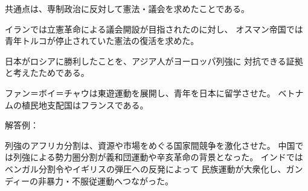 \documentclass[a4paper,11pt]{ltjsarticle}
\begin{document}
\begin{description}[
  style=nextline,
  leftmargin=0pt,
  labelindent=0pt
]
\item[第8問]

共通点は、専制政治に反対して憲法・議会を求めたことである。

イランでは立憲革命による議会開設が目指されたのに対し、
オスマン帝国では青年トルコが停止されていた憲法の復活を求めた。

\item[第9問]

日本がロシアに勝利したことを、アジア人がヨーロッパ列強に
対抗できる証拠と考えたためである。

ファン＝ボイ＝チャウは東遊運動を展開し、青年を日本に留学させた。
ベトナムの植民地支配国はフランスである。

\item[第10問]

解答例：

列強のアフリカ分割は、資源や市場をめぐる国家間競争を激化させた。
中国では列強による勢力圏分割が義和団運動や辛亥革命の背景となった。
インドではベンガル分割令やイギリスの弾圧への反発によって
民族運動が大衆化し、ガンディーの非暴力・不服従運動へつながった。

\end{description}
\end{document}
